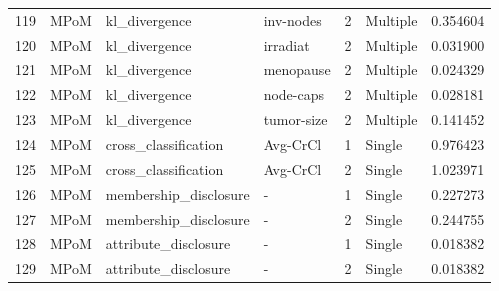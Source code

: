 \begin{tabular}{llllrlr}
119 &     MPoM &          kl\_divergence &    inv-nodes &    2 &  Multiple &  0.354604 \\
120 &     MPoM &          kl\_divergence &     irradiat &    2 &  Multiple &  0.031900 \\
121 &     MPoM &          kl\_divergence &    menopause &    2 &  Multiple &  0.024329 \\
122 &     MPoM &          kl\_divergence &    node-caps &    2 &  Multiple &  0.028181 \\
123 &     MPoM &          kl\_divergence &   tumor-size &    2 &  Multiple &  0.141452 \\
124 &     MPoM &   cross\_classification &     Avg-CrCl &    1 &    Single &  0.976423 \\
125 &     MPoM &   cross\_classification &     Avg-CrCl &    2 &    Single &  1.023971 \\
126 &     MPoM &  membership\_disclosure &            - &    1 &    Single &  0.227273 \\
127 &     MPoM &  membership\_disclosure &            - &    2 &    Single &  0.244755 \\
128 &     MPoM &   attribute\_disclosure &            - &    1 &    Single &  0.018382 \\
129 &     MPoM &   attribute\_disclosure &            - &    2 &    Single &  0.018382 \\
\bottomrule
\end{tabular}
